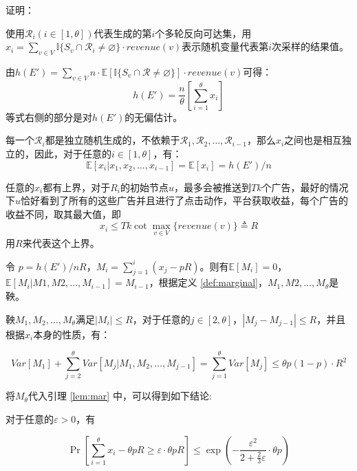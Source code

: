 \noindent 证明：

使用$\mathcal{R}_i(i\in[1,\theta])$代表生成的第$i$个多轮反向可达集，用$x_i=\sum_{v\in V}\mathbb{I}\{S_v\cap\mathcal{R}_i\ne \varnothing  \}\cdot revenue(v)$表示随机变量代表第$i$次采样的结果值。

由$h(E')=\sum_{v \in V} n\cdot\mathbb{E}[\mathbb{I}\{S_v\cap \mathcal{R}\ne \varnothing \}]\cdot revenue(v)$可得：
\begin{equation}
h(E')=\frac{n}{\theta}\left[\sum_{i=1}^{\theta}x_i\right]
\end{equation}
\noindent 等式右侧的部分是对$h(E')$的无偏估计。

每一个$\mathcal{R}_i$都是独立随机生成的，不依赖于$\mathcal{R}_1,\mathcal{R}_2,\ldots,\mathcal{R}_{i-1}$，那么$x_i$之间也是相互独立的，因此，对于任意的$i\in[1,\theta]$，有：
\begin{equation}
\mathbb{E}[x_i|x_1,x_2,\ldots,x_{i-1}]=\mathbb{E}[x_i]=h(E')/n
\end{equation}

任意的$x_i$都有上界，对于$R_i$的初始节点$u$，最多会被推送到$Tk$个广告，最好的情况下$u$恰好看到了所有的这些广告并且进行了点击动作，平台获取收益，每个广告的收益不同，取其最大值，即
\begin{equation}
x_i\le Tk\cot \max_{v\in V}\{revenue(v)\}\triangleq R
\end{equation}
\noindent 用$R$来代表这个上界。

令 $p=h(E')/nR$，$M_i=\sum_{j=1}^{i}(x_j-pR)$。则有$\mathbb{E}[M_i]=0$，$\mathbb{E}[M_i|M1,M2,\ldots,M_{i-1}]=M_{i-1}$，根据定义 \ref{def:marginal}，$M_1,M2,\ldots,M_\theta$是鞅。

鞅$M_1,M_2,\ldots,M_\theta$满足$|M_i|\le R$，对于任意的$j\in [2,\theta]$，$|M_j-M_{j-1}|\le R$，并且根据$x_i$本身的性质，有：

\begin{equation}
    Var[M_1]+\sum_{j=2}^{\theta}Var[M_j|M_1,M_2,\ldots,M_{j-1}]=\sum_{j=1}^{\theta}Var[M_j] \le \theta p(1-p)\cdot R^2
\end{equation}

将$M_\theta$代入引理 \ref{lem:mar} 中，可以得到如下结论:

对于任意的$\varepsilon > 0$，有

\begin{equation}
\Pr\left[\sum_{i=1}^{\theta}x_i- \theta pR \ge \varepsilon \cdot \theta p R\right] \le \exp(-\frac{\varepsilon^2}{2+\frac{2}{3}\varepsilon}\cdot \theta p)
\end{equation}

